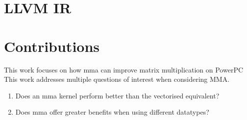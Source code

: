 \documentclass[\main/thesis.tex]{subfiles}
\begin{document}
\section{LLVM IR}
\label{sec:ir}

\section{Contributions}
This work focuses on how \gls{mma} can improve matrix multiplication on PowerPC
This work addresses multiple questions of interest when considering MMA.
\begin{enumerate}
  \item
    Does an \gls{mma} kernel perform better than the vectorised equivalent?
  \item
    Does \gls{mma} offer greater benefits when using different datatypes?
\end{enumerate}
\end{document}
